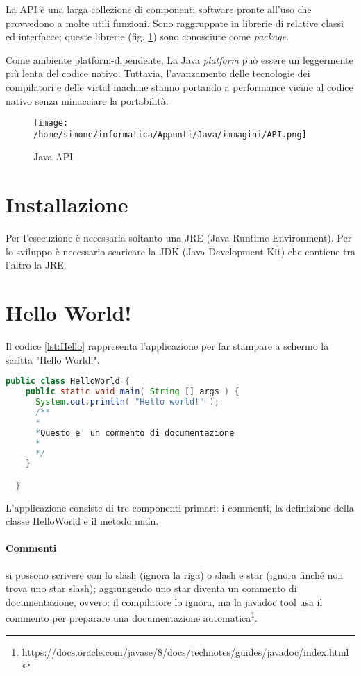 \documentclass[a4paper,12pt,twoside]{book}
\begin{document}
La API è una larga collezione di componenti software pronte all'uso
che provvedono a molte utili funzioni. Sono raggruppate in librerie di
relative classi ed interfacce; queste librerie (fig. \ref{fig:API})
sono conosciute come \emph{package}.

Come ambiente platform-dipendente, La Java \emph{platform} può essere
un leggermente più lenta del codice nativo. Tuttavia, l'avanzamento
delle tecnologie dei compilatori e delle virtal machine stanno
portando a performance vicine al codice nativo senza minacciare la
portabilità.
\begin{figure}
  \centering
  \texttt{[image: /home/simone/informatica/Appunti/Java/immagini/API.png]}
  \caption{Java API \label{fig:API}}
\end{figure}
\FloatBarrier

\section{Installazione}

Per l'esecuzione è necessaria soltanto una JRE (Java Runtime
Environment). Per lo sviluppo è necessario scaricare la JDK (Java
Development Kit) che contiene tra l'altro la JRE.

\section{Hello World!}

Il codice \ref{lst:Hello} rappresenta l'applicazione per far stampare
a schermo la scritta "Hello World!".
\begin{lstlisting}[caption={Hello world!},label={lst:Hello},language=Java]
  public class HelloWorld {
    public static void main( String [] args ) {
      System.out.println( "Hello world!" );
      /**
      *
      *Questo e' un commento di documentazione
      *
      */
    }

  }

\end{lstlisting}

L'applicazione consiste di tre componenti primari: i commenti, la
definizione della classe HelloWorld e il metodo main.

\paragraph{Commenti} si possono scrivere con lo slash (ignora la
riga) o slash e star (ignora finché non trova uno star slash);
aggiungendo uno star diventa un commento di documentazione, ovvero: il
compilatore lo ignora, ma la javadoc tool usa il commento per
preparare una documentazione automatica\footnote{\url{https://docs.oracle.com/javase/8/docs/technotes/guides/javadoc/index.html}}.
\end{document}
